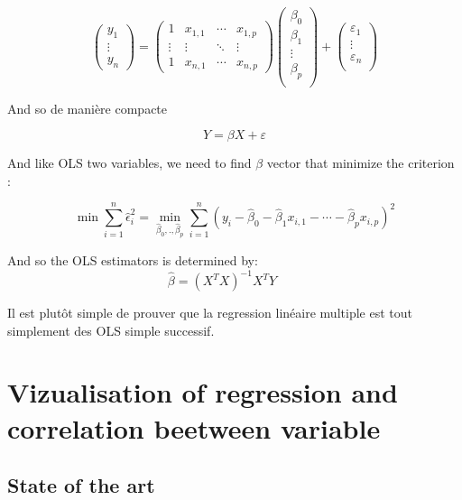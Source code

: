 \documentclass[
]{report}
\begin{document}
\[{\displaystyle {\begin{pmatrix}y_{1}\\\vdots \\y_{n}\end{pmatrix}}={\begin{pmatrix}1&x_{1,1}&\cdots &x_{1,p}\\\vdots &\vdots &\ddots &\vdots \\1 &x_{n,1}&\cdots &x_{n,p}\end{pmatrix}}{\begin{pmatrix}\beta_{0}\\\beta_{1}\\\vdots \\\beta_{p}\\\end{pmatrix}}+{\begin{pmatrix}\varepsilon_{1}\\\vdots \\\varepsilon _{n}\\\end{pmatrix}}}\]

And so de manière compacte

\[Y = \beta X + \varepsilon \]

And like OLS two variables, we need to find \(\beta\) vector that minimize the criterion :

\[{\displaystyle \min \sum_{i=1}^{n}{\hat{\epsilon }}_{i}^{2}=\min_{{\hat{\beta}}_{0},.,{\hat{\beta}}_{p}}\sum_{i=1}^{n}(y_{i}-{\hat{\beta}}_{0}-{\hat {\beta}}_{1}x_{i,1}-\cdots -{\hat{\beta}}_{p}x_{i,p})^{2}}\]

And so the OLS estimators is determined by:
\[\displaystyle {\hat {\beta}}=(X^{T}X)^{-1}X^{T}Y\qquad\]

Il est plutôt simple de prouver que la regression linéaire multiple est tout simplement des OLS simple successif.

\hypertarget{vizualisation-of-regression-and-correlation-beetween-variable}{%
\chapter{Vizualisation of regression and correlation beetween variable}\label{vizualisation-of-regression-and-correlation-beetween-variable}}

\hypertarget{state-of-the-art-1}{%
\section{State of the art}\label{state-of-the-art-1}}
\end{document}
